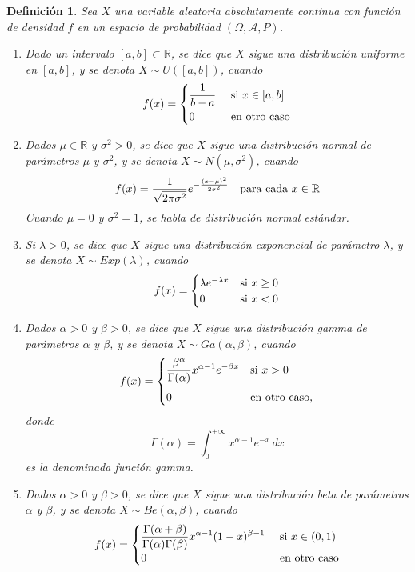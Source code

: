 \documentclass[11pt]{report}
\newtheorem{definition}{Definición}
\theoremstyle{definition}
\newcommand{\R}{\mathbb R}
\begin{document}
\begin{definition}
Sea $X$ una variable aleatoria absolutamente continua con función de densidad $f$ en un espacio de probabilidad $(\Omega,\mathcal{A},P)$.
\begin{enumerate}
    \item Dado un intervalo $[a,b] \subset \R$, se dice que $X$ sigue una \emph{distribución uniforme en $[a,b]$}, y se denota $X \sim U([a,b])$, cuando
    \[f(x)=\begin{cases}
        \displaystyle{\frac{1}{b-a}} & $ si $ x \in [a,b] \\[5pt]
        0 & $ en otro caso$
    \end{cases}\]
    \item Dados $\mu \in \R$ y $\sigma^2 > 0$, se dice que $X$ sigue una \emph{distribución normal de parámetros $\mu$ y $\sigma^2$}, y se denota $X \sim N(\mu,\sigma^2)$, cuando
    \[f(x) = \frac{1}{\sqrt{2\pi\sigma^2}}e^{-\frac{(x-\mu)^2}{2\sigma^2}} \quad \textup{para cada } x \in \R\]
    Cuando $\mu=0$ y $\sigma^2=1$, se habla de \emph{distribución normal estándar}.
    \item Si $\lambda > 0$, se dice que $X$ sigue una \emph{distribución exponencial de parámetro $\lambda$}, y se denota $X \sim Exp(\lambda)$, cuando
    \[f(x) = \begin{cases}
        \lambda e^{-\lambda x} & $si$ \ x \geq 0 \\
        0 & $si$ \ x < 0
    \end{cases}\]
    \item Dados $\alpha > 0$ y $\beta >0$, se dice que $X$ sigue una \emph{distribución gamma de parámetros $\alpha$ y $\beta$}, y se denota $X \sim Ga(\alpha,\beta)$, cuando
    \[f(x) =\begin{cases}
        \displaystyle \frac{\beta^\alpha}{\Gamma(\alpha)}x^{\alpha-1}e^{-\beta x} & $si $ x>0 \\[10pt]
        0 & $en otro caso,$
    \end{cases} \]
    donde
    \[\Gamma(\alpha)=\int_0^{+\infty} x^{\alpha-1}e^{-x} \, dx\]
    es la denominada \emph{función gamma}.
    \item Dados $\alpha > 0$ y $\beta >0$, se dice que $X$ sigue una \emph{distribución beta de parámetros $\alpha$ y $\beta$}, y se denota $X \sim Be(\alpha,\beta)$, cuando
    \[f(x) = \begin{cases}
        \displaystyle \frac{\Gamma(\alpha+\beta)}{\Gamma(\alpha)\Gamma(\beta)}x^{\alpha-1}(1-x)^{\beta-1} & $ si $ x \in (0,1) \\[5pt]
        0 & $ en otro caso$
    \end{cases}\]
\end{enumerate}
\end{definition}
\end{document}
